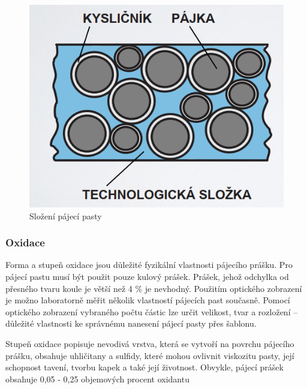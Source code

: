 \begin{figure}[h]
   \begin{center}
     \includegraphics[scale=0.6]{images/Pasta.png}
   \end{center}
   \caption{Složení pájecí pasty}
\end{figure}
\pagebreak
\subsubsection{Oxidace}
 Forma a stupeň oxidace jsou důležité fyzikální vlastnosti pájecího prášku. Pro pájecí pastu
musí být použit pouze kulový prášek. Prášek, jehož odchylka od přesného tvaru koule je
větší než 4 \% je nevhodný. Použitím optického zobrazení je možno laboratorně měřit
několik vlastností pájecích past současně. Pomocí optického zobrazení vybraného počtu
částic lze určit velikost, tvar a rozložení – důležité vlastnosti ke správnému nanesení
pájecí pasty přes šablonu.

Stupeň oxidace popisuje nevodivá vrstva, která se vytvoří na povrchu pájecího prášku,
obsahuje uhličitany a sulfidy, které mohou ovlivnit viskozitu pasty, její schopnost tavení,
tvorbu kapek a také její životnost. Obvykle, pájecí prášek obsahuje 0,05 - 0,25 objemových
procent oxidantu

